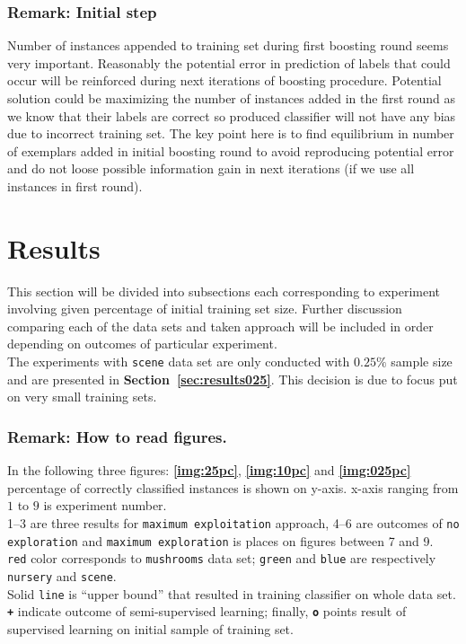 \documentclass[12pt, a4paper, pdflatex]{report}
\begin{document}
\subsubsection{Remark: Initial step}
Number of instances appended to training set during first boosting round seems very important. Reasonably the potential error in prediction of labels that could occur will be reinforced during next iterations of boosting procedure. Potential solution could be maximizing the number of instances added in the first round as we know that their labels are correct so produced classifier will not have any bias due to incorrect training set. The key point here is to find equilibrium in number of exemplars added in initial boosting round to avoid reproducing potential error and do not loose possible information gain in next iterations (if we use all instances in first round).


\section{Results~\cite{results} \label{sec:results}}
This section will be divided into subsections each corresponding to experiment involving given percentage of initial training set size. Further discussion comparing each of the data sets and taken approach will be included in order depending on outcomes of particular experiment.\\

The experiments with \texttt{scene} data set are only conducted with $0.25\%$ sample size and are presented in \textbf{Section~\ref{sec:results025}}. This decision is due to focus put on very small training sets.

\subsubsection{Remark: How to read figures.}
In the following three figures: \textbf{\ref{img:25pc}}, \textbf{\ref{img:10pc}} and \textbf{\ref{img:025pc}} percentage of correctly classified instances is shown on y-axis. x-axis ranging from $1$ to $9$ is experiment number.\\
1--3 are three results for \texttt{maximum exploitation} approach, 4--6 are outcomes of \texttt{no exploration} and \texttt{maximum exploration} is places on figures between 7 and 9.\\
\texttt{red} color corresponds to \texttt{mushrooms} data set; \texttt{green} and \texttt{blue} are respectively \texttt{nursery} and \texttt{scene}.\\
Solid \texttt{line} is ``upper bound'' that resulted in training classifier on whole data set. \texttt{\textbf{+}} indicate outcome of semi-supervised learning; finally, \texttt{\textbf{o}} points result of supervised learning on initial sample of training set.
\end{document}
